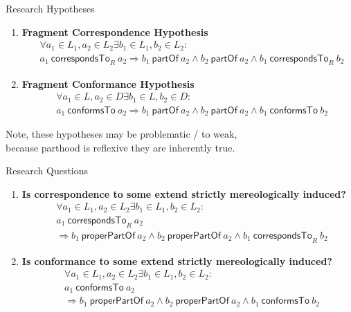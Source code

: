 \documentclass{beamer}
\newcommand{\partOf}{~\textsf{partOf}~}
\newcommand{\properPartOf}{~\textsf{properPartOf}~}
\newcommand{\correspondsToR}[1]{~\textsf{correspondsTo}_{#1}~}
\newcommand{\conformsTo}{~\textsf{conformsTo}~}
\begin{document}
\begin{frame}{Research Hypotheses}
\begin{enumerate}[RH1]
\item
\textbf{Fragment Correspondence Hypothesis}
{\scriptsize
\begin{align*}
&\forall a_1 \in L_1, a_2 \in L_2 \exists b_1 \in L_1, b_2 \in L_2 :  
\\&a_1 \correspondsToR{R} a_2
\Rightarrow 
b_1 \partOf a_2 
\wedge b_2 \partOf a_2
\wedge b_1 \correspondsToR{R} b_2
\end{align*}
}
\item
\textbf{Fragment Conformance Hypothesis}
{\scriptsize
\begin{align*}
&\forall a_1 \in L, a_2 \in D \exists b_1 \in L, b_2 \in D : 
\\&a_1 \conformsTo a_2
\Rightarrow 
b_1 \partOf a_2
\wedge b_2 \partOf a_2
\wedge b_1 \conformsTo b_2
\end{align*}
}
\end{enumerate}
\begin{center}
\tiny
Note, these hypotheses may be problematic / to weak,
\\because parthood is reflexive they are inherently true.
\end{center}
\end{frame}

\begin{frame}{Research Questions}
\begin{enumerate}[RQ1]

\item
\textbf{Is correspondence to some extend strictly mereologically induced?}
{\scriptsize
\begin{align*}
&\forall a_1 \in L_1, a_2 \in L_2 \exists b_1 \in L_1, b_2 \in L_2 :
\\&a_1 \correspondsToR{R} a_2
\\&\Rightarrow 
b_1 \properPartOf a_2 
\wedge b_2 \properPartOf a_2 
\wedge b_1 \correspondsToR{R} b_2
\end{align*}
}

\item
\textbf{Is conformance to some extend strictly mereologically induced?}
{\scriptsize
\begin{align*}
&\forall a_1 \in L_1, a_2 \in L_2 \exists b_1 \in L_1, b_2 \in L_2 :
\\&a_1 \conformsTo a_2
\\&\Rightarrow 
b_1 \properPartOf a_2 
\wedge b_2 \properPartOf a_2 
\wedge b_1 \conformsTo b_2
\end{align*}
}

\end{enumerate}
\end{frame}
\end{document}
